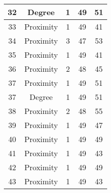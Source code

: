 \documentclass[results.tex]{subfiles}
\begin{document}
\begin{center}
\begin{tabular}{| c || c | c | c | c |}
            \hline
            32                      & Degree                       & 1                      & 49                      & 51                   \\
            \hline
            33                      & Proximity                    & 1                      & 49                      & 41                   \\
            \hline
            34                      & Proximity                    & 3                      & 47                      & 53                   \\
            \hline
            35                      & Proximity                    & 1                      & 49                      & 41                   \\
            \hline
            36                      & Proximity                    & 2                      & 48                      & 45                   \\
            \hline
            37                      & Proximity                    & 1                      & 49                      & 51                   \\
            \hline
            37                      & Degree                       & 1                      & 49                      & 51                   \\
            \hline
            38                      & Proximity                    & 2                      & 48                      & 55                   \\
            \hline
            39                      & Proximity                    & 1                      & 49                      & 47                   \\
            \hline
            40                      & Proximity                    & 1                      & 49                      & 49                   \\
            \hline
            41                      & Proximity                    & 1                      & 49                      & 43                   \\
            \hline
            42                      & Proximity                    & 1                      & 49                      & 49                   \\
            \hline
            43                      & Proximity                    & 1                      & 49                      & 43                   \\

\end{tabular}
\end{center}
\end{document}
